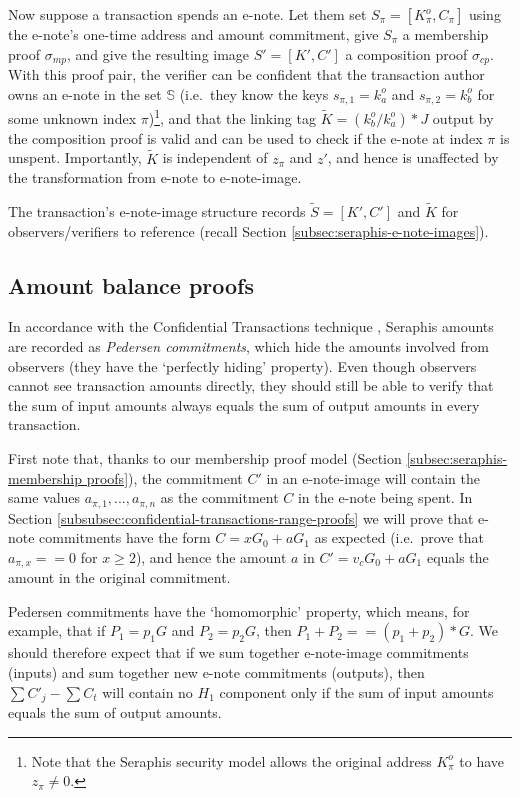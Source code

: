 Now suppose a transaction spends an e-note. Let them set $S_{\pi} = [K^o_{\pi}, C_{\pi}]$ using the e-note's one-time address and amount commitment, give $S_{\pi}$ a membership proof $\sigma_{mp}$, and give the resulting image $S' = [K', C']$ a composition proof $\sigma_{cp}$. With this proof pair, the verifier can be confident that the transaction author owns an e-note in the set $\mathbb{S}$ (i.e.\ they know the keys $s_{\pi,1} = k^o_a$ and $s_{\pi,2} = k^o_b$ for some unknown index $\pi$)\footnote{Note that the Seraphis security model allows the original address $K^o_{\pi}$ to have $z_{\pi} \neq 0$.}, and that the linking tag $\tilde{K} = (k^o_b/k^o_a)*J$ output by the composition proof is valid and can be used to check if the e-note at index $\pi$ is unspent. Importantly, $\tilde{K}$ is independent of $z_{\pi}$ and $z'$, and hence is unaffected by the transformation from e-note to e-note-image.

The transaction's e-note-image structure records $\tilde{S} = [K', C']$ and $\tilde{K}$ for observers/verifiers to reference (recall Section \ref{subsec:seraphis-e-note-images}).


\subsection{Amount balance proofs}
\label{subsec:seraphis-amount-balance-proofs}

In accordance with the Confidential Transactions technique \cite{maxwell-ct-2}, Seraphis amounts are recorded as {\em Pedersen commitments}, which hide the amounts involved from observers (they have the `perfectly hiding' property). Even though observers cannot see transaction amounts directly, they should still be able to verify that the sum of input amounts always equals the sum of output amounts in every transaction.

First note that, thanks to our membership proof model (Section \ref{subsec:seraphis-membership proofs}), the commitment $C'$ in an e-note-image will contain the same values $a_{\pi,1},...,a_{\pi,n}$ as the commitment $C$ in the e-note being spent. In Section \ref{subsubsec:confidential-transactions-range-proofs} we will prove that e-note commitments have the form $C = x G_0 + a G_1$ as expected (i.e.\ prove that $a_{\pi,x} == 0$ for $x \geq 2$), and hence the amount $a$ in $C' = v_c G_0 + a G_1$ equals the amount in the original commitment.

Pedersen commitments have the `homomorphic' property, which means, for example, that if $P_1 = p_1 G$ and $P_2 = p_2 G$, then $P_1 + P_2 == (p_1 + p_2)*G$. We should therefore expect that if we sum together e-note-image commitments (inputs) and sum together new e-note commitments (outputs), then $\sum C'_j - \sum C_t$ will contain no $H_1$ component only if the sum of input amounts equals the sum of output amounts.

